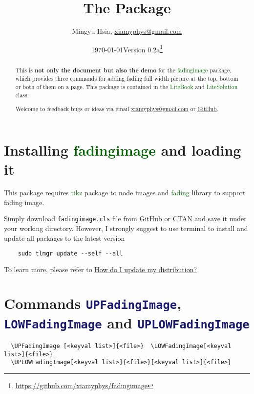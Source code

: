 \documentclass[11pt,svgnames]{article}
\title{\bfseries The \pkg{fadingimage} Package}
\author{Mingyu Hsia, \href{mailto:xiamyphys@gmail.com}{\ttfamily xiamyphys@gmail.com}}
\affil{Hangzhou Dianzi University}
\date{\today\quad Version 0.2a\thanks{\url{https://github.com/xiamyphys/fadingimage}}}
\def\pkg#1{\textcolor{DarkGreen}{\textsf{#1}}}
\def\cmd#1{\textcolor{MidnightBlue}{\texttt{\string#1}}}
\begin{document}
\maketitle
{}

\vspace{-6ex}
\begin{abstract}

This is \textsf{\textbf{not only the document but also the demo}} for the \pkg{fadingimage} package, which provides three commands for adding fading full width picture at the top, bottom or both of them on a page. This package is contained in the \pkg{LiteBook} and \pkg{LiteSolution} class.

Welcome to feedback bugs or ideas via email \href{mailto:xiamyphys@gmail.com}{\ttfamily xiamyphys@gmail.com} or \href{https://github.com/xiamyphys/fadingimage}{GitHub}.

\end{abstract}

\section{Installing \pkg{fadingimage} and loading it}

This package requires \pkg{tikz} package to node images and \pkg{fading} library to support fading image.

Simply download \verb|fadingimage.cls| file from \href{https://github.com/xiamyphys/fadingimage}{GitHub} or \href{https://ctan.org/pkg/fadingimage}{CTAN} and save it under your working directory. However, I strongly suggest to use terminal to install and update all packages to the latest version

\begin{verbatim}
    sudo tlmgr update --self --all
\end{verbatim}

To learn more, please refer to \href{https://tex.stackexchange.com/questions/55437/how-do-i-update-my-tex-distribution}{How do I update my  distribution?}

\section{Commands \cmd{UPFadingImage}, \cmd{LOWFadingImage} and \cmd{UPLOWFadingImage}}

\begin{small}\begin{verbatim}
  \UPFadingImage [<keyval list>]{<file>}  \LOWFadingImage[<keyval list>]{<file>}
  \UPLOWFadingImage[<keyval list>]{<file>}[<keyval list>]{<file>}
\end{verbatim}\end{small}
\end{document}
